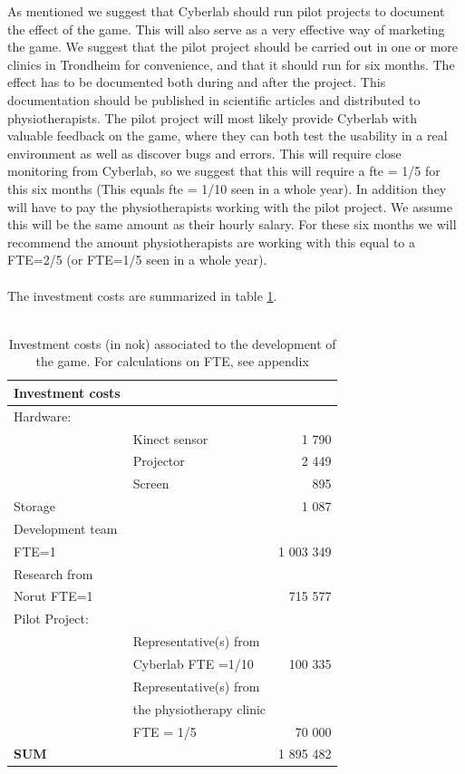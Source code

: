 As mentioned we suggest that Cyberlab should run pilot projects to document the effect of the game. This will also serve as a very effective way of marketing the game. We suggest that the pilot project should be carried out in one or more clinics in Trondheim for convenience, and that it should run for six months. The effect has to be documented both during and after the project. This documentation should be published in scientific articles and distributed to physiotherapists. The pilot project will most likely provide Cyberlab with valuable feedback on the game, where they can both test the usability in a real environment as well as discover bugs and errors. This will require close monitoring from Cyberlab, so we suggest that this will require a \ac{fte} = 1/5 for this six months (This equals \ac{fte} = 1/10 seen in a whole year). In addition they will have to pay the physiotherapists working with the pilot project. We assume this will be the same amount as their hourly salary. For these six months we will recommend the amount physiotherapists are working with this equal to a FTE=2/5 (or FTE=1/5 seen in a whole year).\\ \\
The investment costs are summarized in table \ref{tab:investmentcosts}.\\ \\
\begin{table}
\centering
    \begin{tabular}{|l|l|r|}
        \hline
       \textbf{Investment costs}  & &\\ \hline
       Hardware: & & \\ \hline
	   & Kinect sensor & 1 790  \\ \hline
	   & Projector & 2 449 \\ \hline
	   & Screen & 895 \\ \hline
	   Storage & & 1 087 \\ \hline
	   Development team & & \\  
	   FTE=1 &  & 1 003 349   \\ \hline
	   Research from & & \\ 
	   Norut FTE=1 & & 715 577 \\ \hline
	   Pilot Project: & & \\ \hline
	   & Representative(s) from & \\
	   & Cyberlab FTE =1/10 & 100 335  \\ \hline
	   & Representative(s) from & \\
	   & the physiotherapy clinic & \\
	   & FTE = 1/5 & 70 000  \\ \hline
	   \textbf{SUM} & & 1 895 482 
 \\ \hline
    \end{tabular}
    \caption[Investment costs associated to the development of the game]{Investment costs (in \ac{nok}) associated to the development of the game. For calculations on FTE, see appendix}
    \label{tab:investmentcosts}
\end{table}
